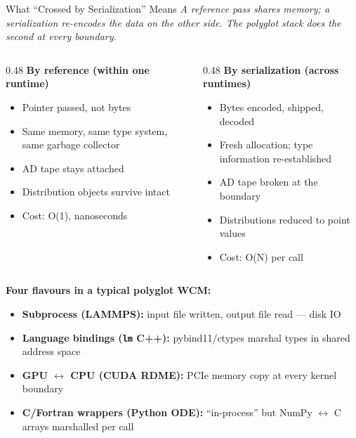 \documentclass[aspectratio=169]{beamer}
\begin{document}
\begin{frame}[noframenumbering]{What ``Crossed by Serialization'' Means}
	\footnotesize
	\textit{A reference pass shares memory; a serialization re-encodes the data on the other side. The polyglot stack does the second at every boundary.}

	\medskip
	\begin{columns}[T]
		\begin{column}{0.48\textwidth}
			\textbf{By reference (within one runtime)}
			\begin{itemize}\itemsep1pt\parskip0pt
				\item Pointer passed, not bytes
				\item Same memory, same type system, same garbage collector
				\item AD tape stays attached
				\item Distribution objects survive intact
				\item Cost: O(1), nanoseconds
			\end{itemize}
		\end{column}
		\begin{column}{0.48\textwidth}
			\textbf{By serialization (across runtimes)}
			\begin{itemize}\itemsep1pt\parskip0pt
				\item Bytes encoded, shipped, decoded
				\item Fresh allocation; type information re-established
				\item AD tape broken at the boundary
				\item Distributions reduced to point values
				\item Cost: O(N) per call
			\end{itemize}
		\end{column}
	\end{columns}

	\medskip
	\textbf{Four flavours in a typical polyglot WCM:}
	\begin{itemize}\itemsep1pt\parskip0pt
		\item \textbf{Subprocess (LAMMPS):} input file written, output file read --- disk IO
		\item \textbf{Language bindings (\texttt{lm} C++):} pybind11/ctypes marshal types in shared address space
		\item \textbf{GPU $\leftrightarrow$ CPU (CUDA RDME):} PCIe memory copy at every kernel boundary
		\item \textbf{C/Fortran wrappers (Python ODE):} ``in-process'' but NumPy $\leftrightarrow$ C arrays marshalled per call
	\end{itemize}
\end{frame}
\end{document}
